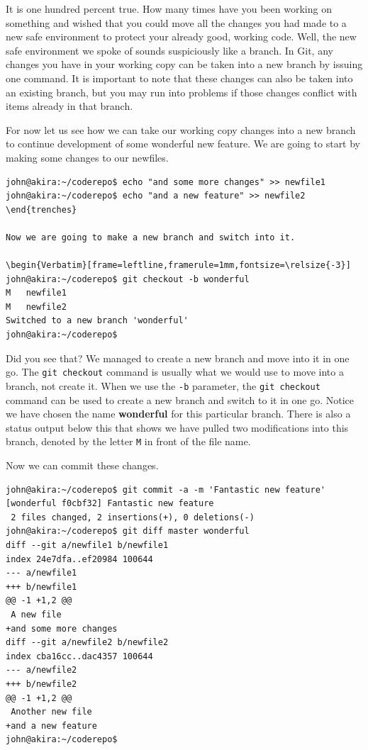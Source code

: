 It is one hundred percent true.  How many times have you been working on something and wished that you could move all the changes you had made to a new safe environment to protect your already good, working code.  Well, the new safe environment we spoke of sounds suspiciously like a branch.  In Git, any changes you have in your working copy can be taken into a new branch by issuing one command.  It is important to note that these changes can also be taken into an existing branch, but you may run into problems if those changes conflict with items already in that branch.

For now let us see how we can take our working copy changes into a new branch to continue development of some wonderful new feature.  We are going to start by making some changes to our newfiles.

\begin{Verbatim}[frame=leftline,framerule=1mm,fontsize=\relsize{-3}] 
john@akira:~/coderepo$ echo "and some more changes" >> newfile1
john@akira:~/coderepo$ echo "and a new feature" >> newfile2
\end{trenches}

Now we are going to make a new branch and switch into it.

\begin{Verbatim}[frame=leftline,framerule=1mm,fontsize=\relsize{-3}] 
john@akira:~/coderepo$ git checkout -b wonderful
M	newfile1
M	newfile2
Switched to a new branch 'wonderful'
john@akira:~/coderepo$ 
\end{Verbatim}

Did you see that?  We managed to create a new branch and move into it in one go.  The \texttt{git checkout} command is usually what we would use to move into a branch, not create it.  When we use the \texttt{-b} parameter, the \texttt{git checkout} command can be used to create a new branch and switch to it in one go.  Notice we have chosen the name \textbf{wonderful} for this particular branch.  There is also a status output below this that shows we have pulled two modifications into this branch, denoted by the letter \texttt{M} in front of the file name.

Now we can commit these changes.

\begin{Verbatim}[frame=leftline,framerule=1mm,fontsize=\relsize{-3}] 
john@akira:~/coderepo$ git commit -a -m 'Fantastic new feature'
[wonderful f0cbf32] Fantastic new feature
 2 files changed, 2 insertions(+), 0 deletions(-)
john@akira:~/coderepo$ git diff master wonderful
diff --git a/newfile1 b/newfile1
index 24e7dfa..ef20984 100644
--- a/newfile1
+++ b/newfile1
@@ -1 +1,2 @@
 A new file
+and some more changes
diff --git a/newfile2 b/newfile2
index cba16cc..dac4357 100644
--- a/newfile2
+++ b/newfile2
@@ -1 +1,2 @@
 Another new file
+and a new feature
john@akira:~/coderepo$ 
\end{Verbatim}

